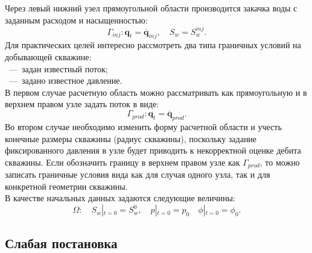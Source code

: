 Через левый нижний узел прямоугольной области производится закачка воды с заданным 
расходом и насыщенностью:
\begin{equation}\label{eq:GammaL}
	\Gamma_{inj}: \bm{q}_{t} = \overline{\bm{q}}_{inj}, \quad S_w = S_w^{inj}.
\end{equation}
Для практических целей интересно рассмотреть два типа граничных условий на добывающей скважине:\\
~---~задан известный поток;\\
~---~задано известное давление.\\
В первом случае расчетную область можно рассматривать как прямоугольную и в верхнем правом узле
задать поток в виде:
\begin{equation}\label{eq:GammaR}
	\Gamma_{prod}: \bm{q}_{t} = \overline{\bm{q}}_{prod}.
\end{equation}
Во втором случае необходимо изменить форму расчетной области и учесть конечные размеры скважины 
(радиус скважины), поскольку задание фиксированного давления в узле будет приводить к 
некорректной оценке дебита скважины. Если обозначить границу в верхнем правом узле как $\Gamma_{prod}$,
то можно записать граничные условия вида  как для случая одного узла, так и для конкретной геометрии скважины.\\
В качестве начальных данных задаются следующие величины:
\begin{equation}\label{eq:init_cond}
	\Omega: \quad S_w\left|_{t=0} = S_w^0\right., \quad p\left|_{t=0} = p_0\right.  \quad \phi\left|_{t=0} = \phi_0\right..
\end{equation}



\subsection{Слабая постановка}


